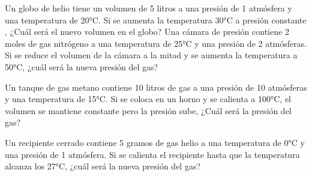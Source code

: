 \documentclass[examen.tex]{subfiles}
\begin{document}
\begin{center}
\end{center}
\begin{questions}
 \question Un globo de helio tiene un volumen de 5 litros a una presión de 1 atmósfera y una temperatura de 20°C. Si se aumenta la temperatura 30°C a presión constante , ¿Cuál será el nuevo volumen en el globo?
\question Una cámara de presión contiene 2 moles de gas nitrógeno a una temperatura de 25°C y una presión de 2 atmósferas. Si se reduce el volumen de la cámara a la mitad y se aumenta la temperatura a 50°C, ¿cuál será la nueva presión del gas?

\question Un tanque de gas metano contiene 10 litros de gas a una presión de 10 atmósferas y una temperatura de 15°C. Si se coloca en un horno y se calienta a 100°C,  el volumen se mantiene constante pero la presión sube, ¿Cuál será la presión del gas?

\question Un recipiente cerrado contiene 5 gramos de gas helio a una temperatura de 0°C y una presión de 1 atmósfera. Si se calienta el recipiente hasta que la temperatura alcanza los 27°C, ¿cuál será la nueva presión del gas?
\end{questions}
\end{document}
